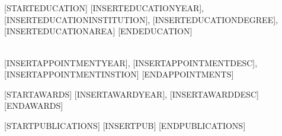 \NameBoldface{\color{\NameColor}{\NameSize [INSERTNAME] ([INSERTROLE]):}}\\
[INSERTAFFILIATION]

\SectionSpacing
{}\\
[STARTEDUCATION]
[INSERTEDUCATIONYEAR], [INSERTEDUCATIONINSTITUTION], [INSERTEDUCATIONDEGREE], [INSERTEDUCATIONAREA]
[ENDEDUCATION]

\SectionSpacing
{}\\
[STARTAPPOINTMENTS]
[INSERTAPPOINTMENTYEAR], [INSERTAPPOINTMENTDESC], [INSERTAPPOINTMENTINSTION]
[ENDAPPOINTMENTS]

\SectionSpacing
{}
[STARTAWARDS]
[INSERTAWARDYEAR], [INSERTAWARDDESC]
[ENDAWARDS]

\SectionSpacing
{}
[STARTPUBLICATIONS]
{\PublicationBullet}[INSERTPUB]
[ENDPUBLICATIONS]

